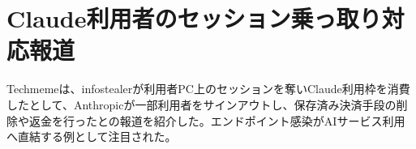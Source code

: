 \section{Claude利用者のセッション乗っ取り対応報道}
Techmemeは、infostealerが利用者PC上のセッションを奪いClaude利用枠を消費したとして、Anthropicが一部利用者をサインアウトし、保存済み決済手段の削除や返金を行ったとの報道を紹介した。エンドポイント感染がAIサービス利用へ直結する例として注目された。

